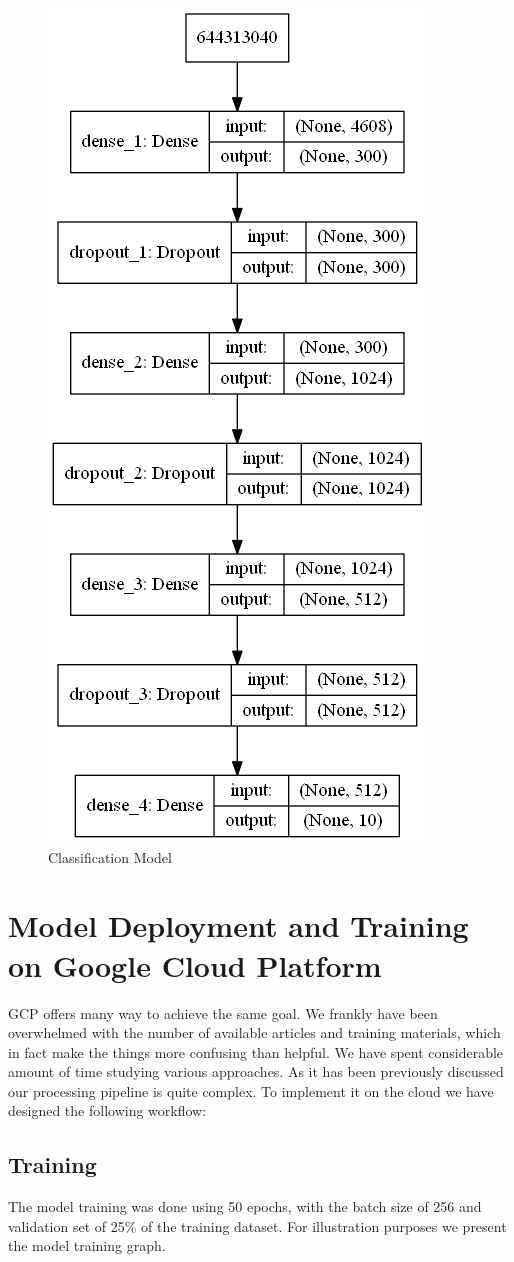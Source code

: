 \begin{Schunk}
\begin{figure}[H]

{\centering \includegraphics[width=0.3\linewidth]{../images/classifier_model} 

}

\caption[Classification Model]{Classification Model}\label{fig:classifier}
\end{figure}
\end{Schunk}

\hypertarget{model-deployment-and-training-on-google-cloud-platform}{%
\section{Model Deployment and Training on Google Cloud
Platform}\label{model-deployment-and-training-on-google-cloud-platform}}

GCP offers many way to achieve the same goal. We frankly have been
overwhelmed with the number of available articles and training
materials, which in fact make the things more confusing than helpful. We
have spent considerable amount of time studying various approaches. As
it has been previously discussed our processing pipeline is quite
complex. To implement it on the cloud we have designed the following
workflow:

\hypertarget{training}{%
\subsection{Training}\label{training}}

The model training was done using 50 epochs, with the batch size of 256
and validation set of 25\% of the training dataset. For illustration
purposes we present the model training graph.

